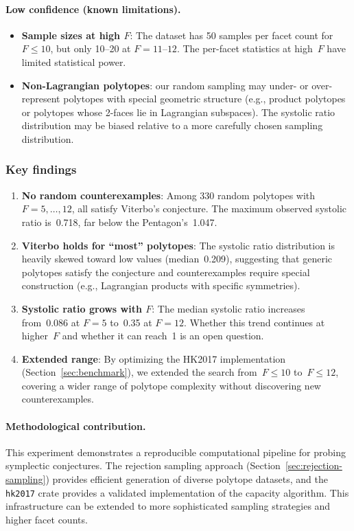 \paragraph{Low confidence (known limitations).}
\begin{itemize}
  \item \textbf{Sample sizes at high $F$}: The dataset has 50 samples per facet
    count for~$F \le 10$, but only 10--20 at $F = 11$--$12$. The per-facet
    statistics at high~$F$ have limited statistical power.
  \item \textbf{Non-Lagrangian polytopes}: our random sampling may under- or
    over-represent polytopes with special geometric structure (e.g., product
    polytopes or polytopes whose 2-faces lie in Lagrangian subspaces). The
    systolic ratio distribution may be
    biased relative to a more carefully chosen sampling distribution.
\end{itemize}

\subsubsection*{Key findings}

\begin{enumerate}
  \item \textbf{No random counterexamples}: Among 330 random polytopes with
    $F = 5, \ldots, 12$, all satisfy Viterbo's conjecture. The maximum observed
    systolic ratio is~0.718, far below the Pentagon's~1.047.

  \item \textbf{Viterbo holds for ``most'' polytopes}: The systolic ratio
    distribution is heavily skewed toward low values (median~0.209), suggesting
    that generic polytopes satisfy the conjecture and counterexamples require
    special construction (e.g., Lagrangian products with specific symmetries).

  \item \textbf{Systolic ratio grows with $F$}: The median systolic ratio
    increases from~0.086 at $F = 5$ to~0.35 at $F = 12$. Whether this trend
    continues at higher~$F$ and whether it can reach~1 is an open question.

  \item \textbf{Extended range}: By optimizing the HK2017 implementation
    (Section~\ref{sec:benchmark}), we extended the search from~$F \le 10$
    to~$F \le 12$, covering a wider range of polytope complexity without
    discovering new counterexamples.
\end{enumerate}

\paragraph{Methodological contribution.}
This experiment demonstrates a reproducible computational
pipeline for probing symplectic conjectures. The rejection sampling approach
(Section~\ref{sec:rejection-sampling}) provides efficient generation of
diverse polytope datasets, and the \texttt{hk2017} crate provides a validated
implementation of the capacity algorithm. This infrastructure can be extended
to more sophisticated sampling strategies and higher facet counts.
